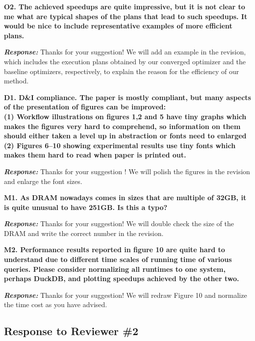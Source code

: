 \textbf{O2. The achieved speedups are quite impressive, but it is not clear to me what are typical shapes of the plans that lead to such speedups. It would be nice to include representative examples of more efficient plans.}

\textbf{\textit{Response: }}
Thanks for your suggestion! We will add an example in the revision, which includes the execution plans obtained by our converged optimizer and the baseline optimizers, respectively, to explain the reason for the efficiency of our method.

\textbf{D1. D\&I compliance. 
The paper is mostly compliant, but many aspects of the presentation of figures can be improved: \\
(1) Workflow illustrations on figures 1,2 and 5 have tiny graphs which makes the figures very hard to comprehend, so information on them should either taken a level up in abstraction or fonts need to enlarged \\
(2) Figures 6--10 showing experimental results use tiny fonts which makes them hard to read when paper is printed out.}

\textbf{\textit{Response: }}
Thanks for your suggestion ! We will polish the figures in the revision and enlarge the font sizes.


\textbf{M1. As DRAM nowadays comes in sizes that are multiple of 32GB, it is quite unusual to have 251GB. Is this a typo?}

\textbf{\textit{Response: }}
Thanks for your suggestion! We will double check the size of the DRAM and write the correct number in the revision.

\textbf{M2. Performance results reported in figure 10 are quite hard to understand due to different time scales of running time of various queries. Please consider normalizing all runtimes to one system, perhaps DuckDB, and plotting speedups achieved by the other two.}

\textbf{\textit{Response: }}
Thanks for your suggestion! We will redraw Figure 10 and normalize the time cost as you have advised.


\subsection{Response to Reviewer \#2}

